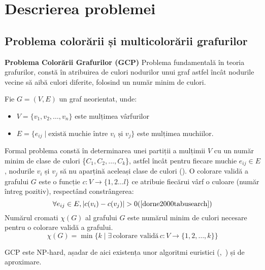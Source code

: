 
\chapter{Descrierea problemei}
 

\section{Problema colorării și multicolorării grafurilor}

{\bf Problema Colorării Grafurilor (GCP)}\label{sec:gcp}
     Problema fundamentală în teoria grafurilor, constă în atribuirea de culori nodurilor unui graf astfel încât nodurile vecine să aibă culori diferite, folosind un număr minim de culori. 
   
  \begin{Def}
Fie $G = (V, E)$ un graf neorientat, unde:
\begin{itemize} 
  \item $V = \{v_1, v_2, \ldots, v_n\}$ este mulțimea vârfurilor
  \item $E = \{e_{ij} \mid \text{există muchie între } v_i \text{ și } v_j\}$ este mulțimea muchiilor.
  \end{itemize} 
  \end{Def}
  Formal problema constă în determinarea unei partiții a mulțimii $V$ cu un număr minim de clase de culori \{$C_1,C_2, \ldots, C_k$\}, astfel încât pentru fiecare muchie $e_{ij} \in E$, nodurile $v_i$ și $v_j$ să nu aparțină aceleași clase de culori (\cite{Papadimitriou1982}). O colorare validă a grafului $G$ este o funcție $c: V \rightarrow \{1,2 \ldots l\}$ ce atribuie fiecărui vârf o culoare (număr întreg pozitiv), respectând constrângerea: 
\begin{equation}
   \forall e_{ij} \in E, |c(v_i)-c(v_j)| > 0 (\cite{dorne2000tabusearch})
   \end{equation}
  Numărul cromati  $\chi(G)$ al grafului $G$ este numărul minim de culori necesare pentru o colorare validă a grafului. 
  \begin{equation}
\chi(G)=\min\{k \mid \exists\, \text{colorare validă}\, c: V \rightarrow \{1,2, \ldots, k\}\}
  \end{equation}

GCP este NP-hard, așadar de aici existența unor algoritmi euristici (\cite{Costa1995},~\cite{Dorne1998}) și de aproximare.
 


\vspace{1cm}

